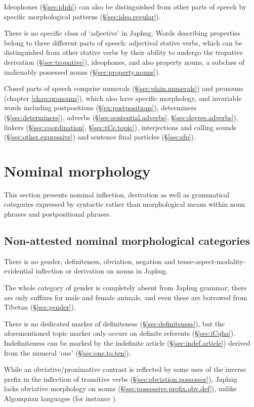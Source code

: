 Ideophones (§\ref{sec:idph}) can also be distinguished from other parts of speech by specific morphological patterns (§\ref{sec:ideo.regular}).

There is no specific class of `adjective' in Japhug. Words describing properties belong to three different parts of speech: adjectival stative verbs, which can be distinguished from other stative verbs by their ability to undergo the tropative derivation (§\ref{sec:tropative}), ideophones, and also property nouns, a subclass of inalienably possessed nouns (§\ref{sec:property.nouns}).

Closed parts of speech comprise numerals (§\ref{sec:plain.numerals}) and pronouns (chapter \ref{chap:pronouns}), which also have specific morphology, and invariable words including postpositions (§\ref{ex:postpositions}), determiners (§\ref{sec:determiners}), adverbs (§\ref{sec:sentential.adverbs}, §\ref{sec:degree.adverbs}), linkers (§\ref{sec:coordination}, §\ref{sec:tCe.topic}), interjections and calling sounds (§\ref{sec:other.expressive}) and sentence final particles (§\ref{sec:sfp}). 

\section{Nominal morphology} \label{sec:noun.introduction}
This section presents nominal inflection, derivation as well as grammatical categories expressed by syntactic rather than morphological means within noun phrases and postpositional phrases.

\subsection{Non-attested nominal morphological categories}
There is no gender, definiteness, obviation, negation and tense-aspect-modality-evidential inflection or derivation on nouns in Japhug. 

The whole category of gender is completely absent from Japhug grammar; there are only suffixes for male and female animals, and even these are borrowed from Tibetan (§\ref{sec:gender}). 

There is no dedicated marker of definiteness (§\ref{sec:definiteness}), but the aforementioned topic marker  only occurs on definite referents (§\ref{sec:iCqha}). Indefiniteness can be marked by the indefinite article  (§\ref{sec:indef.article}) derived from the numeral `one' (§\ref{sec:one.to.ten}). 

While an obviative/proximative contrast is reflected by some uses of the inverse prefix in the inflection of transitive verbs (§\ref{sec:obviation.possessor}), Japhug lacks obviative morphology on nouns (§\ref{sec:possessive.prefix.obv.def}), unlike Algonquian languages (for instance \citealt[183]{valentine01grammar}).
 
